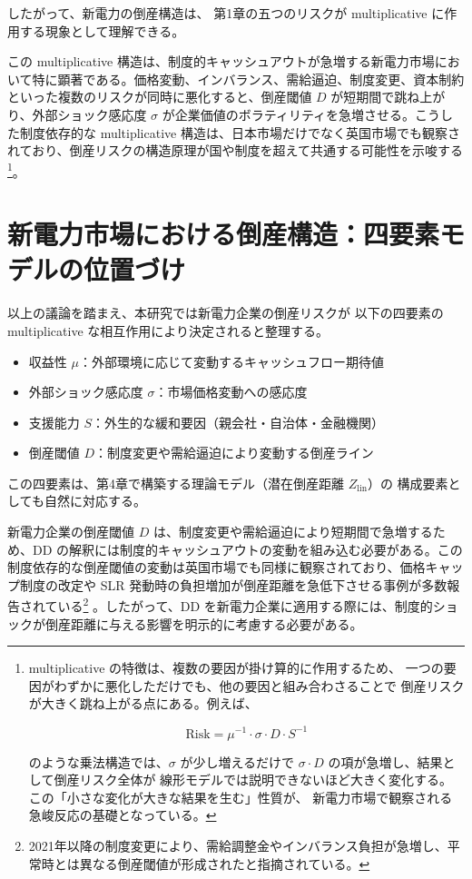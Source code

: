 したがって、新電力の倒産構造は、
第1章の五つのリスクが multiplicative に作用する現象として理解できる。

この multiplicative 構造は、制度的キャッシュアウトが急増する新電力市場において特に顕著である。価格変動、インバランス、需給逼迫、制度変更、資本制約といった複数のリスクが同時に悪化すると、倒産閾値 $D$ が短期間で跳ね上がり、外部ショック感応度 $\sigma$ が企業価値のボラティリティを急増させる。こうした制度依存的な multiplicative 構造は、日本市場だけでなく英国市場でも観察されており、倒産リスクの構造原理が国や制度を超えて共通する可能性を示唆する\footnote{
multiplicative の特徴は、複数の要因が掛け算的に作用するため、
一つの要因がわずかに悪化しただけでも、他の要因と組み合わさることで
倒産リスクが大きく跳ね上がる点にある。例えば、


\[
\text{Risk} = \mu^{-1} \cdot \sigma \cdot D \cdot S^{-1}
\]


のような乗法構造では、$\sigma$ が少し増えるだけで
$\sigma \cdot D$ の項が急増し、結果として倒産リスク全体が
線形モデルでは説明できないほど大きく変化する。
この「小さな変化が大きな結果を生む」性質が、
新電力市場で観察される急峻反応の基礎となっている。}。



\section{新電力市場における倒産構造：四要素モデルの位置づけ}

以上の議論を踏まえ、本研究では新電力企業の倒産リスクが
以下の四要素の multiplicative な相互作用により決定されると整理する。

\begin{itemize}
    \item 収益性 $\mu$：外部環境に応じて変動するキャッシュフロー期待値
    \item 外部ショック感応度 $\sigma$：市場価格変動への感応度
    \item 支援能力 $S$：外生的な緩和要因（親会社・自治体・金融機関）
    \item 倒産閾値 $D$：制度変更や需給逼迫により変動する倒産ライン
\end{itemize}

この四要素は、第4章で構築する理論モデル（潜在倒産距離 $Z_{\text{lin}}$）の
構成要素としても自然に対応する。

新電力企業の倒産閾値 $D$ は、制度変更や需給逼迫により短期間で急増するため、DD の解釈には制度的キャッシュアウトの変動を組み込む必要がある。この制度依存的な倒産閾値の変動は英国市場でも同様に観察されており、価格キャップ制度の改定や SLR 発動時の負担増加が倒産距離を急低下させる事例が多数報告されている\footnote{2021年以降の制度変更により、需給調整金やインバランス負担が急増し、平常時とは異なる倒産閾値が形成されたと指摘されている。}
。したがって、DD を新電力企業に適用する際には、制度的ショックが倒産距離に与える影響を明示的に考慮する必要がある。



